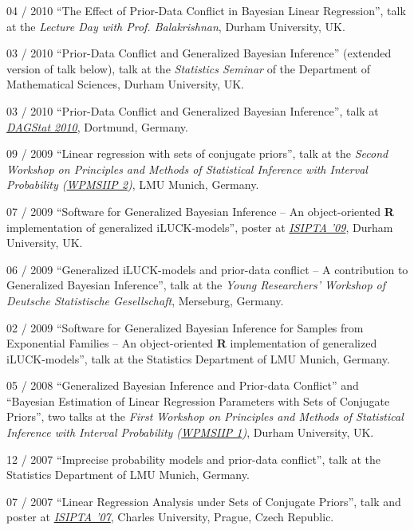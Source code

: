 \documentclass[a4paper]{simplecv}
\begin{document}
\begin{topic}
\item[04 / 2010] ``The Effect of Prior-Data Conflict in Bayesian Linear Regression'', talk at the
                 \emph{Lecture Day with Prof. Balakrishnan}, Durham University, UK.

\item[03 / 2010] ``Prior-Data Conflict and Generalized Bayesian Inference'' (extended version of talk below), talk at the
                 \emph{Statistics Seminar} of the Department of Mathematical Sciences, Durham University, UK.

\item[03 / 2010] ``Prior-Data Conflict and Generalized Bayesian Inference'', talk at
                 \emph{\href{http://www.statistik.tu-dortmund.de/DAGStat2010/en/index.html}{DAGStat 2010}}, Dortmund, Germany.

\item[09 / 2009] ``Linear regression with sets of conjugate priors'', talk at the
                 \emph{Second Workshop on Principles and Methods of Statistical Inference with Interval Probability (\href{http://www.stat.uni-muenchen.de/~walter/workshop0909/}{WPMSIIP 2})}, LMU Munich, Germany.

\item[07 / 2009] ``Software for Generalized Bayesian Inference -- An object-oriented \textbf{R} implementation of generalized iLUCK-models'', poster at
                 \emph{\href{http://www.sipta.org/isipta09/}{ISIPTA '09}}, Durham University, UK.

\item[06 / 2009] ``Generalized iLUCK-models and prior-data conflict -- A contribution to Generalized Bayesian Inference'', talk at the
                 \emph{Young Researchers' Workshop of Deutsche Statistische Gesellschaft}, Merseburg, Germany.

\item[02 / 2009] ``Software for Generalized Bayesian Inference for Samples from Exponential Families -- An object-oriented \textbf{R} implementation of generalized iLUCK-models'', talk at
                 the Statistics Department of LMU Munich, Germany.

\item[05 / 2008] ``Generalized Bayesian Inference and Prior-data Conflict'' and ``Bayesian Estimation of Linear Regression Parameters with Sets of Conjugate Priors'', two talks at the
                 \emph{First Workshop on Principles and Methods of Statistical Inference with Interval Probability (\href{http://www.maths.dur.ac.uk/users/matthias.troffaes/workshopip2008/index.html}{WPMSIIP 1})}, Durham University, UK.

\item[12 / 2007] ``Imprecise probability models and prior-data conflict'', talk at
                 the Statistics Department of LMU Munich, Germany.

\item[07 / 2007] ``Linear Regression Analysis under Sets of Conjugate Priors'', talk and poster at
                 \emph{\href{http://www.sipta.org/isipta07/}{ISIPTA '07}}, Charles University, Prague, Czech Republic.

\end{topic}
\end{document}
